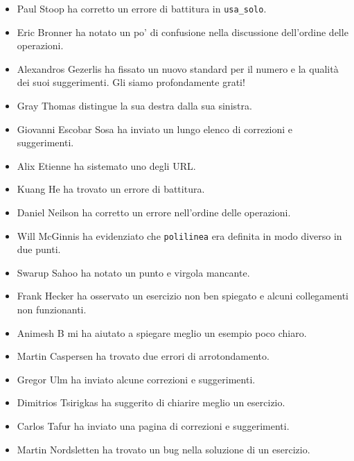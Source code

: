 \documentclass[10pt]{book}
\begin{document}
\begin{itemize}
\item Paul Stoop ha corretto un errore di battitura in \verb+usa_solo+.

\item Eric Bronner ha notato un po' di confusione nella discussione dell'ordine delle operazioni.

\item Alexandros Gezerlis ha fissato un nuovo standard per il numero e la qualità dei suoi suggerimenti. Gli siamo profondamente grati!

\item Gray Thomas distingue la sua destra dalla sua sinistra.

\item Giovanni Escobar Sosa ha inviato un lungo elenco di correzioni e suggerimenti.

\item Alix Etienne ha sistemato uno degli URL.

\item Kuang He ha trovato un errore di battitura.

\item Daniel Neilson ha corretto un errore nell'ordine delle operazioni.

\item Will McGinnis ha evidenziato che {\tt polilinea} era definita in modo diverso in due punti.

\item Swarup Sahoo ha notato un punto e virgola mancante.

\item Frank Hecker ha osservato un esercizio non ben spiegato e alcuni collegamenti non funzionanti.

\item Animesh B mi ha aiutato a spiegare meglio un esempio poco chiaro.

\item Martin Caspersen ha trovato due errori di arrotondamento.

\item Gregor Ulm ha inviato alcune correzioni e suggerimenti.

\item Dimitrios Tsirigkas ha suggerito di chiarire meglio un esercizio.

\item Carlos Tafur ha inviato una pagina di correzioni e suggerimenti.

\item Martin Nordsletten ha trovato un bug nella soluzione di un esercizio.


\end{itemize}
\end{document}
